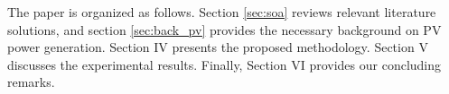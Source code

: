 The paper is organized as follows. Section \ref{sec:soa} reviews relevant literature solutions, and section \ref{sec:back_pv} provides the necessary background on PV power generation. Section IV presents the proposed methodology. Section
V discusses the experimental results. Finally, Section VI provides our concluding remarks.